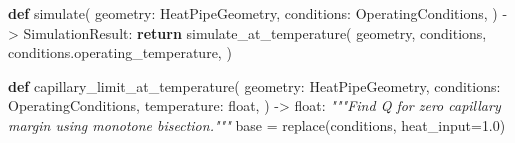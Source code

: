 \documentclass[
  12pt,
  12pt,a4paper,oneside]{report}
\newenvironment{Shaded}{}{}
\newcommand{\BuiltInTok}[1]{\textcolor[rgb]{0.00,0.50,0.00}{#1}}
\newcommand{\CommentTok}[1]{\textcolor[rgb]{0.38,0.63,0.69}{\textit{#1}}}
\newcommand{\ControlFlowTok}[1]{\textcolor[rgb]{0.00,0.44,0.13}{\textbf{#1}}}
\newcommand{\FloatTok}[1]{\textcolor[rgb]{0.25,0.63,0.44}{#1}}
\newcommand{\KeywordTok}[1]{\textcolor[rgb]{0.00,0.44,0.13}{\textbf{#1}}}
\newcommand{\NormalTok}[1]{#1}
\newcommand{\OperatorTok}[1]{\textcolor[rgb]{0.40,0.40,0.40}{#1}}
\begin{document}
\begin{Shaded}
\begin{Highlighting}[]
\KeywordTok{def}\NormalTok{ simulate(}
\NormalTok{    geometry: HeatPipeGeometry, conditions: OperatingConditions,}
\NormalTok{) }\OperatorTok{{-}\textgreater{}}\NormalTok{ SimulationResult:}
    \ControlFlowTok{return}\NormalTok{ simulate\_at\_temperature(}
\NormalTok{        geometry, conditions, conditions.operating\_temperature,}
\NormalTok{    )}


\KeywordTok{def}\NormalTok{ capillary\_limit\_at\_temperature(}
\NormalTok{    geometry: HeatPipeGeometry,}
\NormalTok{    conditions: OperatingConditions,}
\NormalTok{    temperature: }\BuiltInTok{float}\NormalTok{,}
\NormalTok{) }\OperatorTok{{-}\textgreater{}} \BuiltInTok{float}\NormalTok{:}
    \CommentTok{"""Find Q for zero capillary margin using monotone bisection."""}
\NormalTok{    base }\OperatorTok{=}\NormalTok{ replace(conditions, heat\_input}\OperatorTok{=}\FloatTok{1.0}\NormalTok{)}


\end{Highlighting}
\end{Shaded}
\end{document}
